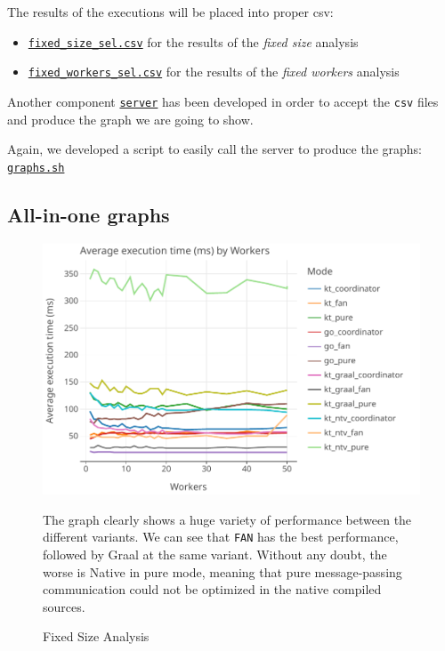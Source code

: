 The results of the executions will be placed into proper csv:
\begin{itemize}
		\item \href{https://github.com/LM-96/Activity-Project-Operating-Systems-M-/blob/main/code/benchmark_results/fixed_size_sel.csv}{\texttt{fixed\_size\_sel.csv}} for the results of the \textit{fixed size} analysis
		
		\item 
		\href{https://github.com/LM-96/Activity-Project-Operating-Systems-M-/blob/main/code/benchmark_results/fixed_workers_sel.csv}{\texttt{fixed\_workers\_sel.csv}} for the results of the \textit{fixed workers} analysis
\end{itemize}

Another component \href{https://github.com/LM-96/Activity-Project-Operating-Systems-M-/tree/main/code/server}{\texttt{server}} has been developed in order to accept the \texttt{csv} files and produce the graph we are going to show.

Again, we developed a script to easily call the server to produce the graphs: \href{https://github.com/LM-96/Activity-Project-Operating-Systems-M-/blob/main/code/graphs.sh}{\texttt{graphs.sh}}

\subsection{All-in-one graphs}

\begin{figure}[H]
	\centering
	\begin{minipage}{0.7\textwidth}
		\centering
		\includegraphics[width=\textwidth]{img/graphs/fixed_size_all}
		\caption{Fixed Size Analysis}
	\end{minipage}\hfill
	\begin{minipage}{0.25\textwidth}
		The graph clearly shows a huge variety of performance between the different variants.  We can see that \Go \texttt{FAN} has the best performance, followed by \Kotlin Graal at the same variant.
		Without any doubt, the worse is \Kotlin Native in pure mode, meaning that pure message-passing communication could not be optimized in the native compiled sources.
	\end{minipage}
\end{figure}

